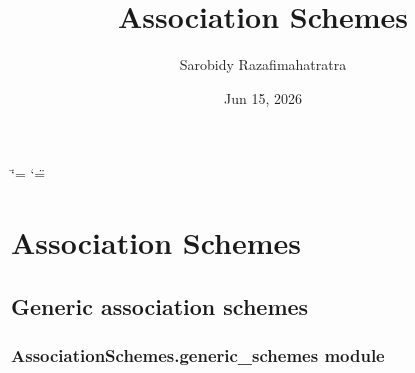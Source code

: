 \documentclass[letterpaper,10pt,english]{sphinxmanual}
\title{Association Schemes}
\date{Jun 15, 2026}
\author{Sarobidy Razafimahatratra}
\begin{document}
\ifdefined\shorthandoff
  \ifnum\catcode`\=\string=\active\shorthandoff{=}\fi
  \ifnum\catcode`\"=\active{}\fi
\fi

\pagestyle{empty}
\sphinxmaketitle
\pagestyle{plain}
\sphinxtableofcontents
\pagestyle{normal}
\label{\detokenize{index::doc}}


\sphinxstepscope


\chapter{Association Schemes}
\label{\detokenize{modules:association-schemes}}\label{\detokenize{modules::doc}}

\section{Generic association schemes}
\label{\detokenize{modules:generic-association-schemes}}
\sphinxstepscope


\subsection{AssociationSchemes.generic\_schemes module}
\label{\detokenize{AssociationSchemes.generic_schemes:module-AssociationSchemes.generic_schemes}}\label{\detokenize{AssociationSchemes.generic_schemes:associationschemes-generic-schemes-module}}\label{\detokenize{AssociationSchemes.generic_schemes::doc}}
\end{document}
